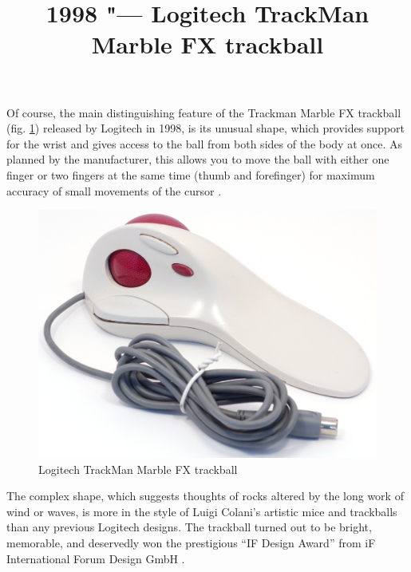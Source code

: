 \documentclass[11pt, a4paper]{article}
\begin{document}
\title{1998 "--- Logitech TrackMan Marble FX trackball}
\date{}
\maketitle
{}
Of course, the main distinguishing feature of the Trackman Marble FX trackball (fig. \ref{fig:trackman}) released by Logitech in 1998, is its unusual shape, which provides support for the wrist and gives access to the ball from both sides of the body at once. As planned by the manufacturer, this allows you to move the ball with either one finger or two fingers at the same time (thumb and forefinger) for maximum accuracy of small movements of the cursor \cite{marbleBoot}.

\begin{figure}[h]
    \centering
    \includegraphics[scale=0.4]{1998_logitech_trackman_marble_fx/pic_30.jpg}
    \caption{Logitech TrackMan Marble FX trackball}
    \label{fig:trackman}
\end{figure}

The complex shape, which suggests thoughts of rocks altered by the long work of wind or waves, is more in the style of Luigi Colani's artistic mice and trackballs than any previous Logitech designs. The trackball turned out to be bright, memorable, and deservedly won the prestigious ``IF Design Award'' from iF International Forum Design GmbH  \cite{award}.
\end{document}
